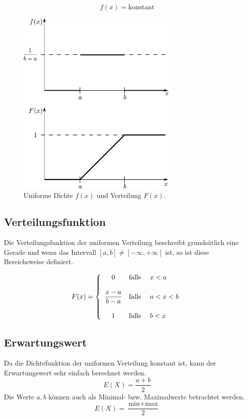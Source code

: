\[  
	f(x) = \mathrm{konstant}
\]

\begin{figure}[h!]
	\centering
	\includegraphics[width=0.7\textwidth]{uniform.pdf}
	\caption{Uniforme Dichte $f(x)$ und Verteilung $F(x)$.}
	\label{fig:uniform}
\end{figure}

\subsection{Verteilungsfunktion}
Die Verteilungsfunktion der uniformen Verteilung beschreibt
grundsätlich eine Gerade und wenn das Intervall 
$[a,b]\neq[-\infty, +\infty]$ ist, so ist diese Bereichsweise
definiert.

\[  
	F(x) = \left\{
		\begin{array}{c c l}
			0 
				& \text{falls } 
				& x < a \\
			& \\
			\displaystyle
			\frac{x-a}{b-a} 
				& \text{falls } 
				& a < x < b \\
			& \\
			1
				& \text{falls } 
				& b < x
		\end{array} \right.
\]

\subsection{Erwartungswert}
Da die Dichtefunktion der uniformen Verteilung konstant ist,
kann der Erwartungswert sehr einfach berechnet werden.
\[  
	E(X) = \frac{a+b}{2}
\]
Die Werte $a,b$ können auch als Minimal- bzw. Maximalwerte
betrachtet werden.
\[  
E(X) = \frac{\text{min} + \text{max}}{2}
\]

